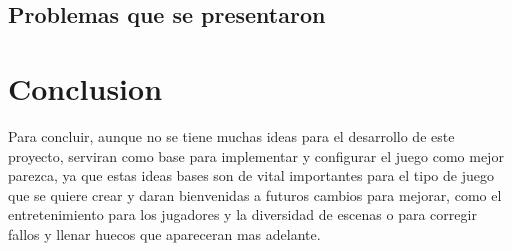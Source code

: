 \documentclass{article}
\begin{document}
\subsection{Problemas que se presentaron}


\newpage
\section{Conclusion} \label{conclusion}
Para concluir, aunque no se tiene muchas ideas para el desarrollo de este proyecto, serviran como base para implementar y configurar el juego como mejor parezca, ya que estas ideas bases son de vital importantes para el tipo de juego que se quiere crear y daran bienvenidas a futuros cambios para mejorar, como el entretenimiento para los jugadores y la diversidad de escenas o para corregir fallos y llenar huecos que apareceran mas adelante.
\end{document}

